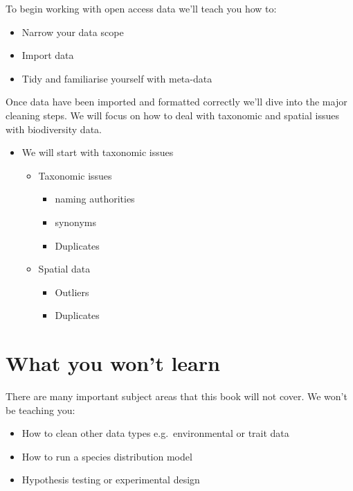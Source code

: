 \documentclass[
  letterpaper,
  DIV=11,
  numbers=noendperiod,
  oneside]{scrreprt}
\providecommand{\tightlist}{%
  \setlength{\itemsep}{0pt}\setlength{\parskip}{0pt}}\usepackage{longtable,booktabs,array}
\begin{document}
To begin working with open access data we'll teach you how to:

\begin{itemize}
\item
  Narrow your data scope
\item
  Import data
\item
  Tidy and familiarise yourself with meta-data
\end{itemize}

Once data have been imported and formatted correctly we'll dive into the
major cleaning steps. We will focus on how to deal with taxonomic and
spatial issues with biodiversity data.

\begin{itemize}
\tightlist
\item
  We will start with taxonomic issues

  \begin{itemize}
  \tightlist
  \item
    Taxonomic issues

    \begin{itemize}
    \tightlist
    \item
      naming authorities
    \item
      synonyms
    \item
      Duplicates
    \end{itemize}
  \item
    Spatial data

    \begin{itemize}
    \tightlist
    \item
      Outliers
    \item
      Duplicates
    \end{itemize}
  \end{itemize}
\end{itemize}

\hypertarget{what-you-wont-learn}{%
\section{What you won't learn}\label{what-you-wont-learn}}

There are many important subject areas that this book will not cover. We
won't be teaching you:

\begin{itemize}
\tightlist
\item
  How to clean other data types e.g.~environmental or trait data
\item
  How to run a species distribution model
\item
  Hypothesis testing or experimental design
\end{itemize}
\end{document}
